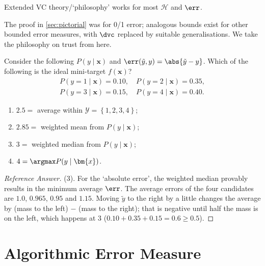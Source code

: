 \begin{moral}
    Extended VC theory/`philosophy' works for most \(\mathcal{H}\) and
    \(\err\).
\end{moral}

The proof in \autoref{sec:pictorial} was for 0/1 error; analogous bounds exist
for other bounded error measures, with \(\dvc\) replaced by suitable
generalisations. We take the philosophy on trust from here.

\begin{exercise}
    Consider the following \(P(y \mid \bm{x})\) and \(\err(\tilde{y}, y) =
    \abs{\tilde{y} - y}\). Which of the following is the ideal mini-target
    \(f(\bm{x})\)?
    \[
        \begin{gathered}
            P(y = 1 \mid \bm{x}) = 0.10, \quad P(y = 2 \mid \bm{x}) = 0.35,\\
            P(y = 3 \mid \bm{x}) = 0.15, \quad P(y = 4 \mid \bm{x}) = 0.40.
        \end{gathered}
    \]
    \begin{enumerate}[(1)]
        \item \(2.5 =\) average within \(\mathcal{Y} = \left\{ 1, 2, 3, 4
            \right\}\);
        \item \(2.85 =\) weighted mean from \(P(y \mid \bm{x})\);
        \item \(3 =\) weighted median from \(P(y \mid \bm{x})\);
        \item \(4 = \argmax P(y \mid \bm{x})\).
    \end{enumerate}
\end{exercise}

\begin{proof}[Reference Answer]
    (3). For the `absolute error', the weighted median provably results in the
    minimum average \(\err\). The average errors of the four candidates are
    \(1.0\), \(0.965\), \(0.95\) and \(1.15\). Moving \(\tilde{y}\) to the
    right by a little changes the average by (mass to the left) \(-\) (mass to
    the right); that is negative until half the mass is on the left, which
    happens at \(3\) (\(0.10 + 0.35 + 0.15 = 0.6 \ge 0.5\)).
\end{proof}

\section{Algorithmic Error Measure}\label{sec:algo-error}


